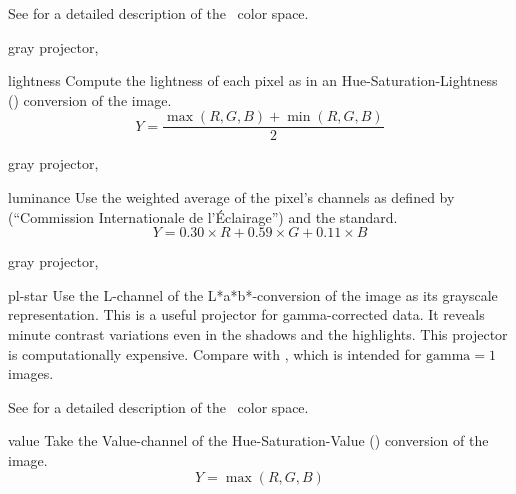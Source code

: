 \begin{codelist}
\begin{codelist}
    See  for a detailed description of the
    ~color space.

           {gray projector, }%
  \item[lightness]\itemend
    Compute the lightness of each  pixel as in an
    Hue\hyp{}Saturation\hyp{}Lightness () conversion of the image.
    \[
    Y = \frac{\max(R, G, B) + \min(R, G, B)}{2}
    \]

           {gray projector, }%
  \item[luminance]\itemend
    Use the weighted average of the  pixel's channels as defined by 
    (``Commission Internationale de l'\'Eclairage'') and the  standard.
    \[
    Y = 0.30 \times R + 0.59 \times G + 0.11 \times B
    \]

           {gray projector, }%
  \item[pl-star]\itemend
    Use the L-channel of the L*a*b*-conversion of the image as its grayscale representation.
    This is a useful projector for gamma-corrected data.  It reveals minute contrast variations
    even in the shadows and the highlights.  This projector is computationally expensive.
    Compare with , which is intended for $\mbox{gamma} = 1$ images.

    See  for a detailed description of the
    ~color space.

  \item[value]\itemend
    Take the Value-channel of the Hue-Saturation-Value () conversion of the image.
    \[
    Y = \max(R, G, B)
    \]
  \end{codelist}
\end{codelist}



